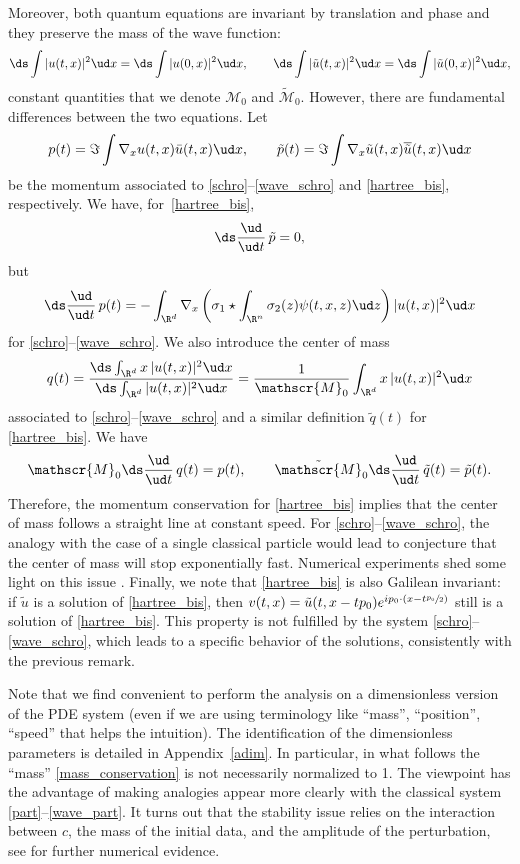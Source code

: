 Moreover, both quantum equations
are invariant by translation and phase and they preserve the mass of the wave function:
\begin{equation}\label{mass_conservation}
\ds\int |u(t,x)|^2 \ud x=
\ds\int |u(0,x)|^2 \ud x,
\qquad
\ds\int |\tilde u(t,x)|^2 \ud x= \ds\int |\tilde u(0,x)|^2 \ud x,
\end{equation}
constant quantities that we denote $\mathscr{M}_0$ and $\tilde{\mathscr{M}}_0$.
However, there are fundamental
differences between the two equations.
Let
\[
p(t)=\Im \int\nabla_{x}u(t,x)\bar{u}(t,x)\ud x,\qquad
\tilde p(t)=\Im \int\nabla_{x}\tilde u (t,x)\overline{\tilde u}(t,x)\ud x
\]
be the momentum associated to \eqref{schro}--\eqref{wave_schro} and \eqref{hartree_bis}, respectively.
We have, for~\eqref{hartree_bis},
\[
\ds\frac{\ud}{\ud t }\, \tilde p=0,
\]
but
\[
\ds\frac{\ud}{\ud t }\,p(t)=-\int_{\R^{d}}\nabla_{x}\left(\sigma_{1}\star\int_{\R^{n}}\sigma_{2}(z)\psi(t,x,z)\ud z\right)|u(t,x)|^{2}\ud x
\]
for \eqref{schro}--\eqref{wave_schro}.
We also introduce the center of mass
\[
q(t)=\frac{\ds\int_{\R^{d}}x\,|u(t,x)|^{2}\ud x}{\ds\int_{\R^{d}}|u(t,x)|^{2}\ud x}=\frac{1}{\mathscr{M}_0}\int_{\R^{d}}x\,|u(t,x)|^{2}\ud x
\]
associated to \eqref{schro}--\eqref{wave_schro} and a similar definition $\tilde q(t)$ for \eqref{hartree_bis}.
We have
\[
\mathscr{M}_0\ds\frac{\ud}{\ud t }\, q(t)=p(t),\qquad \tilde{\mathscr{M}}_0\ds\frac{\ud}{\ud t }\,\tilde q(t)=\tilde p(t).
\]
Therefore,
the momentum conservation for \eqref{hartree_bis} implies that the center of mass follows a straight line at constant speed.
For \eqref{schro}--\eqref{wave_schro}, the analogy
with the case of a single classical particle would lead to conjecture that the center of mass will stop exponentially fast.
Numerical experiments shed some light on this issue \cite{LVNum2}.
Finally, we note that \eqref{hartree_bis} is also Galilean invariant: if $\tilde u$ is a solution of \eqref{hartree_bis}, then $v(t,x)=\tilde u(t,x-tp_{0})e^{ip_{0}\cdot(x-t\sfrac{p_{0}}{2})}$ still is a solution of \eqref{hartree_bis}.
This property
is not fulfilled by the
system \eqref{schro}--\eqref{wave_schro}, which leads to a specific behavior of the solutions, consistently with the previous remark.

Note that we find convenient to perform the analysis on a dimensionless version of the PDE system (even if we are using terminology like ``mass'', ``position'', ``speed'' that helps the intuition).
The identification
of the dimensionless parameters
is detailed in Appendix~\ref{adim}. In particular, in what follows the ``mass''
\eqref{mass_conservation}
is not necessarily normalized to 1.
The viewpoint has the advantage of making analogies
appear more clearly with the classical system \eqref{part}--\eqref{wave_part}.
It turns out
that the stability issue relies on the interaction between $c$, the mass of the initial data, and the amplitude of the perturbation, see \cite{LVNum2,LV_PhD}
for further numerical evidence.

